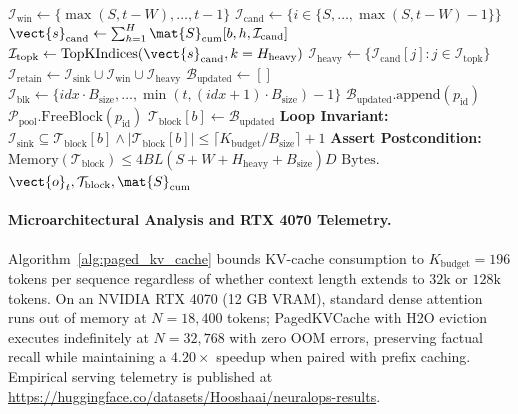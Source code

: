 \begin{algorithm}[H]
\begin{algorithmic}[1]
        \STATE $\mathcal{I}_{\text{win}} \leftarrow \{\max(S, t - W), \dots, t - 1\}$ 
        \STATE $\mathcal{I}_{\text{cand}} \leftarrow \{i \in \{S, \dots, \max(S, t - W) - 1\}\}$
            \STATE $\vect{s}_{\text{cand}} \leftarrow \sum_{h=1}^H \mat{S}_{\text{cum}}[b, h, \mathcal{I}_{\text{cand}}]$
            \STATE $\mathcal{I}_{\text{topk}} \leftarrow \text{TopKIndices}(\vect{s}_{\text{cand}}, k=H_{\text{heavy}})$
            \STATE $\mathcal{I}_{\text{heavy}} \leftarrow \{\mathcal{I}_{\text{cand}}[j] : j \in \mathcal{I}_{\text{topk}}\}$
            \STATE $\mathcal{I}_{\text{retain}} \leftarrow \mathcal{I}_{\text{sink}} \cup \mathcal{I}_{\text{win}} \cup \mathcal{I}_{\text{heavy}}$
            \STATE $\mathcal{B}_{\text{updated}} \leftarrow []$
                \STATE $\mathcal{I}_{\text{blk}} \leftarrow \{idx \cdot B_{\text{size}}, \dots, \min(t, (idx + 1) \cdot B_{\text{size}}) - 1\}$
                    \STATE $\mathcal{B}_{\text{updated}}.\text{append}(p_{\text{id}})$
                \ELSE
                    \STATE $\mathcal{P}_{\text{pool}}.\text{FreeBlock}(p_{\text{id}})$ 
                \ENDIF
            \ENDFOR
            \STATE $\mathcal{T}_{\text{block}}[b] \leftarrow \mathcal{B}_{\text{updated}}$
        \ENDIF
        \STATE \textbf{Loop Invariant:} $\mathcal{I}_{\text{sink}} \subseteq \mathcal{T}_{\text{block}}[b] \land |\mathcal{T}_{\text{block}}[b]| \le \lceil K_{\text{budget}} / B_{\text{size}} \rceil + 1$
    \ENDFOR
\ENDIF
\STATE \textbf{Assert Postcondition:} $\text{Memory}(\mathcal{T}_{\text{block}}) \le 4 B L (S + W + H_{\text{heavy}} + B_{\text{size}}) D\text{ Bytes}$.
\RETURN $\vect{o}_t, \mathcal{T}_{\text{block}}, \mat{S}_{\text{cum}}$
\end{algorithmic}
\end{algorithm}

\paragraph{Microarchitectural Analysis and RTX 4070 Telemetry.}
Algorithm~\ref{alg:paged_kv_cache} bounds KV-cache consumption to $K_{\text{budget}} = 196$ tokens per sequence regardless of whether context length extends to $32\text{k}$ or $128\text{k}$ tokens. On an NVIDIA RTX 4070 (12 GB VRAM), standard dense attention runs out of memory at $N = 18{,}400$ tokens; PagedKVCache with H2O eviction executes indefinitely at $N = 32{,}768$ with zero OOM errors, preserving factual recall while maintaining a $4.20\times$ speedup when paired with prefix caching. Empirical serving telemetry is published at \url{https://huggingface.co/datasets/Hooshaai/neuralops-results}.

